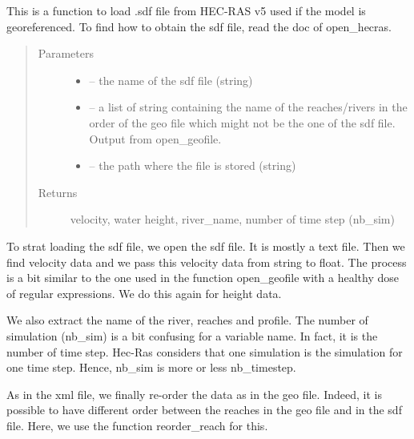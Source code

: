 \documentclass[letterpaper,10pt,english]{sphinxmanual}
\begin{document}
\begin{fulllineitems}
\label{\detokenize{index:src.Hec_ras06.open_sdffile}}
This is a function to load .sdf file from HEC-RAS v5 used if the model is georeferenced. To find how to obtain the
sdf file, read the doc of open\_hecras.
\begin{quote}\begin{description}
\item[{Parameters}] \leavevmode\begin{itemize}
\item {} 
 -- the name of the sdf file (string)

\item {} 
 -- a list of string containing the name of the reaches/rivers in the order of the geo file
which might not be the one of the sdf file. Output from open\_geofile.

\item {} 
 -- the path where the file is stored (string)

\end{itemize}

\item[{Returns}] \leavevmode
velocity, water height, river\_name, number of  time step (nb\_sim)

\end{description}\end{quote}


To strat loading the sdf file, we open the sdf file. It is mostly a text file. Then we find velocity data and we
pass this velocity data from string to float. The process is a bit similar to the one used in the function
open\_geofile with a healthy dose of regular expressions. We do this again for height data.

We also extract the name of the river, reaches and profile. The number of simulation (nb\_sim) is a bit confusing
for a variable name. In fact, it is the number of time step. Hec-Ras considers that one simulation is the simulation
for one time step. Hence, nb\_sim is more or less nb\_timestep.

As in the xml file, we finally re-order the data as in the geo file. Indeed, it is possible to have different order
between the reaches in the geo file and in the sdf file. Here, we use the function reorder\_reach for this.

\end{fulllineitems}
\end{document}
